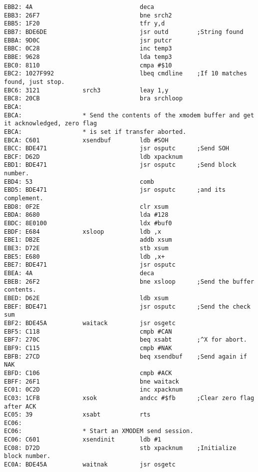 {\begin{verbatim}
EBB2: 4A                              deca 
EBB3: 26F7                            bne srch2
EBB5: 1F20                            tfr y,d
EBB7: BDE6DE                          jsr outd        ;String found
EBBA: 9D0C                            jsr putcr
EBBC: 0C28                            inc temp3
EBBE: 9628                            lda temp3
EBC0: 8110                            cmpa #$10
EBC2: 1027F992                        lbeq cmdline    ;If 10 matches found, just stop.
EBC6: 3121            srch3           leay 1,y
EBC8: 20CB                            bra srchloop
EBCA:                 
EBCA:                 * Send the contents of the xmodem buffer and get it acknowledged, zero flag
EBCA:                 * is set if transfer aborted.
EBCA: C601            xsendbuf        ldb #SOH                
EBCC: BDE471                          jsr osputc      ;Send SOH
EBCF: D62D                            ldb xpacknum
EBD1: BDE471                          jsr osputc      ;Send block number.
EBD4: 53                              comb
EBD5: BDE471                          jsr osputc      ;and its complement.
EBD8: 0F2E                            clr xsum
EBDA: 8680                            lda #128
EBDC: 8E0100                          ldx #buf0
EBDF: E684            xsloop          ldb ,x
EBE1: DB2E                            addb xsum
EBE3: D72E                            stb xsum        
EBE5: E680                            ldb ,x+
EBE7: BDE471                          jsr osputc
EBEA: 4A                              deca
EBEB: 26F2                            bne xsloop      ;Send the buffer contents.
EBED: D62E                            ldb xsum
EBEF: BDE471                          jsr osputc      ;Send the check sum
EBF2: BDE45A          waitack         jsr osgetc
EBF5: C118                            cmpb #CAN
EBF7: 270C                            beq xsabt       ;^X for abort.
EBF9: C115                            cmpb #NAK        
EBFB: 27CD                            beq xsendbuf    ;Send again if NAK
EBFD: C106                            cmpb #ACK
EBFF: 26F1                            bne waitack
EC01: 0C2D                            inc xpacknum
EC03: 1CFB            xsok            andcc #$fb      ;Clear zero flag after ACK              
EC05: 39              xsabt           rts
EC06:                                 
EC06:                 * Start an XMODEM send session.
EC06: C601            xsendinit       ldb #1
EC08: D72D                            stb xpacknum    ;Initialize block number.
EC0A: BDE45A          waitnak         jsr osgetc

\end{verbatim}}
